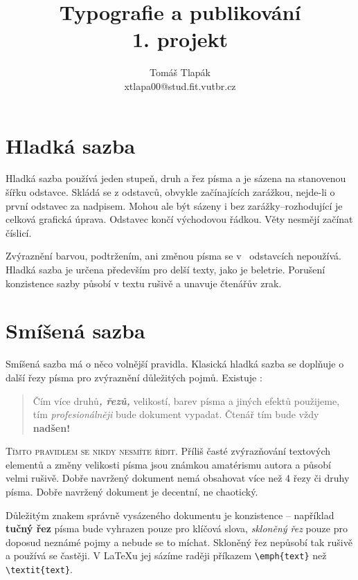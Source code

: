 \documentclass[10pt, a4paper, twocolumn]{article}
\title{Typografie a publikování \\ {\large 1. projekt}}
\author{ Tomáš Tlapák \\[3pt] xtlapa00@stud.fit.vutbr.cz}
\date{}
\begin{document}
\maketitle

\section{Hladká sazba}

Hladká sazba používá jeden stupeň, druh a řez písma\linebreak 
a je sázena na stanovenou šířku odstavce. Skládá se z odstavců, obvykle začínajících zarážkou, nejde-li o první odstavec za nadpisem. Mohou ale být sázeny i bez zarážky--rozhodující je celková grafická úprava. Odstavec končí východovou řádkou. Věty nesmějí začínat číslicí.\par

\indent Zvýraznění barvou, podtržením, ani změnou písma se v~  odstavcích nepoužívá. Hladká sazba je určena především pro delší texty, jako je beletrie. Porušení konzistence sazby působí v textu rušivě a unavuje čtenářův zrak.\par

\section{Smíšená sazba} \label{sec:nadpis2}

Smíšená sazba má o něco volnější pravidla. Klasická hladká sazba se doplňuje o další řezy písma pro zvýraznění důležitých pojmů. Existuje :
\begin{quotation}
	\indent Čím více {\selectfont druhů}\textbf{\emph{, 		řezů,}} {\small velikostí}, barev písma\linebreak 
	{\selectfont a jiných efektů} použijeme, tím 			    \textit{profesionálněji} bude  dokument vypadat.  Čtenář tím       			{\tiny bude} vždy \textbf{{\huge nadšen!}}
\end{quotation}

\indent \textsc{Tímto pravidlem se nikdy nesmíte řídit}. Příliš časté zvýrazňování textových elementů a změny velikosti písma jsou známkou amatérismu autora a působí velmi rušivě. Dobře navržený dokument nemá obsahovat více než 4 řezy či druhy písma. Dobře navržený dokument je decentní, ne chaotický.\par

\indent Důležitým znakem správně vysázeného dokumentu je konzistence -- například \textbf{tučný řez} písma bude vyhrazen pouze pro klíčová slova, \emph{skloněný řez} pouze pro doposud neznámé pojmy a nebude se to míchat. Skloněný řez nepůsobí tak rušivě a používá se častěji. V \LaTeX u jej sázíme raději příkazem \verb|\emph{text}| než \verb|\textit{text}|.\par
\end{document}
